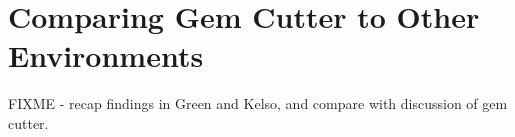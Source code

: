\section{Comparing Gem Cutter to Other Environments}

FIXME - recap findings in Green and Kelso, and compare with discussion of gem cutter.